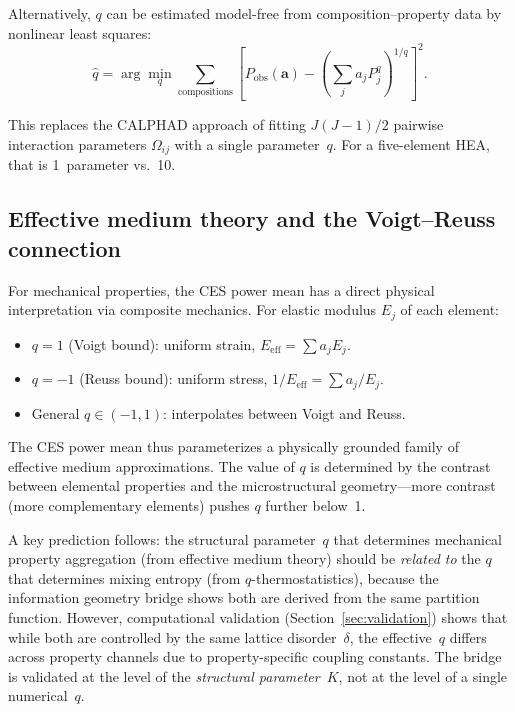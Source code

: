 \documentclass[12pt,letterpaper]{article}
\theoremstyle{definition}
\begin{document}
Alternatively, $q$ can be estimated model-free from composition--property data by nonlinear least squares:
\begin{equation}\label{eq:q_NLS}
  \hat{q} = \arg\min_q \sum_{\text{compositions}} \left[P_{\text{obs}}(\mathbf{a}) - \left(\sum_j a_j P_j^q\right)^{1/q}\right]^2.
\end{equation}

This replaces the CALPHAD approach of fitting $J(J-1)/2$ pairwise interaction parameters $\Omega_{ij}$ with a single parameter~$q$.  For a five-element HEA, that is 1~parameter vs.~10.

\subsection{Effective medium theory and the Voigt--Reuss connection}

For mechanical properties, the CES power mean has a direct physical interpretation via composite mechanics.  For elastic modulus $E_j$ of each element:
\begin{itemize}
  \item $q = 1$ (Voigt bound): uniform strain, $E_{\mathrm{eff}} = \sum a_j E_j$.
  \item $q = -1$ (Reuss bound): uniform stress, $1/E_{\mathrm{eff}} = \sum a_j / E_j$.
  \item General $q \in (-1, 1)$: interpolates between Voigt and Reuss.
\end{itemize}

The CES power mean thus parameterizes a physically grounded family of effective medium approximations.  The value of $q$ is determined by the contrast between elemental properties and the microstructural geometry---more contrast (more complementary elements) pushes $q$ further below~1.

A key prediction follows: the structural parameter~$q$ that determines mechanical property aggregation (from effective medium theory) should be \emph{related to} the $q$ that determines mixing entropy (from $q$-thermostatistics), because the information geometry bridge shows both are derived from the same partition function.  However, computational validation (Section~\ref{sec:validation}) shows that while both are controlled by the same lattice disorder~$\delta$, the effective~$q$ differs across property channels due to property-specific coupling constants.  The bridge is validated at the level of the \emph{structural parameter}~$K$, not at the level of a single numerical~$q$.
\end{document}
